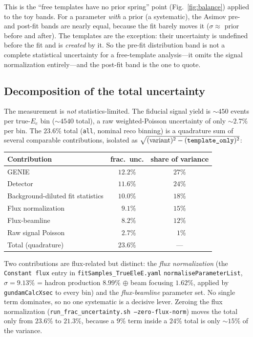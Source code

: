 \documentclass[11pt]{article}
\newcommand{\code}[1]{\texttt{#1}}
\begin{document}
This is the ``free templates have no prior spring'' point
(Fig.~\ref{fig:balance}) applied to the toy bands. For a parameter \emph{with} a
prior (a systematic), the Asimov pre- and post-fit bands are nearly equal,
because the fit barely moves it ($\sigma\approx$ prior before and after). The
templates are the exception: their uncertainty is undefined before the fit and is
\emph{created} by it. So the pre-fit distribution band is not a complete
statistical uncertainty for a free-template analysis---it omits the signal
normalization entirely---and the post-fit band is the one to quote.

\subsection{Decomposition of the total uncertainty}

The measurement is \emph{not} statistics-limited. The fiducial signal yield is
$\sim\!450$ events per true-$E_e$ bin ($\sim\!4540$ total), a raw
weighted-Poisson uncertainty of only $\sim\!2.7\%$ per bin. The $23.6\%$ total
(\code{all}, nominal reco binning) is a quadrature sum of several comparable
contributions, isolated as $\sqrt{(\text{variant})^2-(\text{\code{template\_only}})^2}$:

\begin{center}
\begin{tabular}{@{}lcc@{}}
\toprule
Contribution & frac.\ unc. & share of variance \\
\midrule
GENIE                                & $12.2\%$ & $27\%$ \\
Detector                             & $11.6\%$ & $24\%$ \\
Background-diluted fit statistics    & $10.0\%$ & $18\%$ \\
Flux normalization                   & $\phantom{0}9.1\%$ & $15\%$ \\
Flux-beamline                        & $\phantom{0}8.2\%$ & $12\%$ \\
Raw signal Poisson                   & $\phantom{0}2.7\%$ & $\phantom{0}1\%$ \\
\midrule
Total (quadrature)                   & $23.6\%$ & --- \\
\bottomrule
\end{tabular}
\end{center}

Two contributions are flux-related but distinct: the \emph{flux normalization}
(the \code{Constant flux} entry in \code{fitSamples\_TrueEleE.yaml}
\code{normaliseParameterList}, $\sigma=9.13\%$ = hadron production $8.99\%$
$\oplus$ beam focusing $1.62\%$, applied by \code{gundamCalcXsec} to every bin)
and the \emph{flux-beamline} parameter set. No single term dominates, so no one
systematic is a decisive lever. Zeroing the flux normalization
(\code{run\_frac\_uncertainty.sh --zero-flux-norm}) moves the total only from
$23.6\%$ to $21.3\%$, because a $9\%$ term inside a $24\%$ total is only
$\sim\!15\%$ of the variance.
\end{document}
